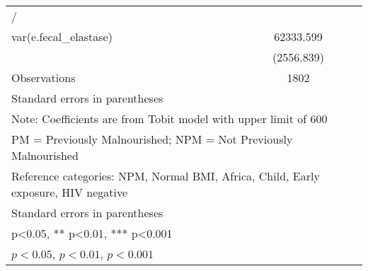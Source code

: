 \begin{table}[htbp]
\begin{tabular}{l*{1}{c}}
\hline
/                   &                     \\
var(e.fecal\_elastase)&   62333.599\sym{***}\\
                    &  (2556.839)         \\
\hline
Observations        &        1802         \\
\hline\hline
\multicolumn{2}{l}{\footnotesize Standard errors in parentheses}\\
\multicolumn{2}{l}{\footnotesize Note: Coefficients are from Tobit model with upper limit of 600}\\
\multicolumn{2}{l}{\footnotesize PM = Previously Malnourished; NPM = Not Previously Malnourished}\\
\multicolumn{2}{l}{\footnotesize Reference categories: NPM, Normal BMI, Africa, Child, Early exposure, HIV negative}\\
\multicolumn{2}{l}{\footnotesize Standard errors in parentheses}\\
\multicolumn{2}{l}{\footnotesize * p<0.05, ** p<0.01, *** p<0.001}\\
\multicolumn{2}{l}{\footnotesize \sym{*} \(p<0.05\), \sym{**} \(p<0.01\), \sym{***} \(p<0.001\)}\\
\end{tabular}
\end{table}
